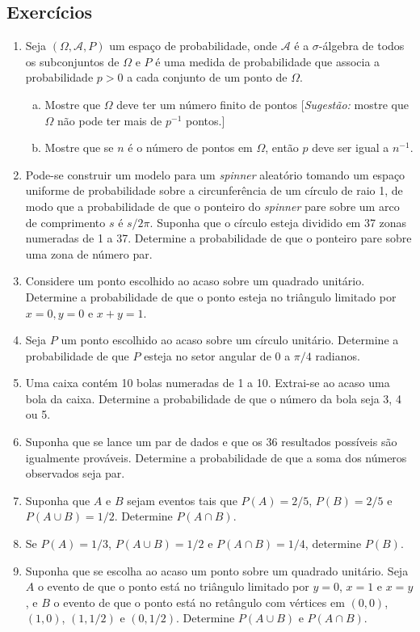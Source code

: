 \documentclass[../Notas.tex]{subfiles}
\begin{document}
\subsection{Exercícios}
\begin{enumerate}
    \item Seja $(\Omega, \mathcal{A}, P)$ um espaço de probabilidade, onde $\mathcal{A}$ é a $\sigma$-álgebra de todos os subconjuntos de $\Omega$ e $P$ é uma medida de probabilidade que associa a probabilidade $p>0$ a cada conjunto de um ponto de $\Omega$.
    \begin{enumerate}[a)]
        \item Mostre que $\Omega$ deve ter um número finito de pontos [\textit{Sugestão:} mostre que $\Omega$ não pode ter mais de $p^{-1}$ pontos.]
        \item Mostre que se $n$ é o número de pontos em $\Omega$, então $p$ deve ser igual a $n^{-1}$.
    \end{enumerate}
    \item Pode-se construir um modelo para um \textit{spinner} aleatório tomando um espaço uniforme de probabilidade sobre a circunferência de um círculo de raio 1, de modo que a probabilidade de que o ponteiro do \textit{spinner} pare sobre um arco de comprimento $s$ é $s/2\pi$. Suponha que o círculo esteja dividido em 37 zonas numeradas de 1 a 37. Determine a probabilidade de que o ponteiro pare sobre uma zona de número par.
    \item Considere um ponto escolhido ao acaso sobre um quadrado unitário. Determine a probabilidade de que o ponto esteja no triângulo limitado por $x=0, y=0$ e $x+y=1$.
    \item Seja $P$ um ponto escolhido ao acaso sobre um círculo unitário. Determine a probabilidade de que $P$ esteja no setor angular de 0 a $\pi/4$ radianos.
    \item Uma caixa contém 10 bolas numeradas de 1 a 10. Extrai-se ao acaso uma bola da caixa. Determine a probabilidade de que o número da bola seja 3, 4 ou 5.
    \item Suponha que se lance um par de dados e que os 36 resultados possíveis são igualmente prováveis. Determine a probabilidade de que a soma dos números observados seja par.
    \item Suponha que $A$ e $B$ sejam eventos tais que $P(A) = 2/5$, $P(B) = 2/5$ e $P(A \cup B) = 1/2$. Determine $P(A \cap B)$.
    \item Se $P(A) = 1/3$, $P(A \cup B) = 1/2$ e $P(A \cap B) = 1/4$, determine $P(B)$.
    \item Suponha que se escolha ao acaso um ponto sobre um quadrado unitário. Seja $A$ o evento de que o ponto está no triângulo limitado por $y = 0$, $x = 1$ e $x = y$, e $B$ o evento de que o ponto está no retângulo com vértices em $(0,0)$, $(1,0)$, $(1, 1/2)$ e $(0,1/2)$. Determine $P(A \cup B)$ e $P(A \cap B)$.

\end{enumerate}
\end{document}
